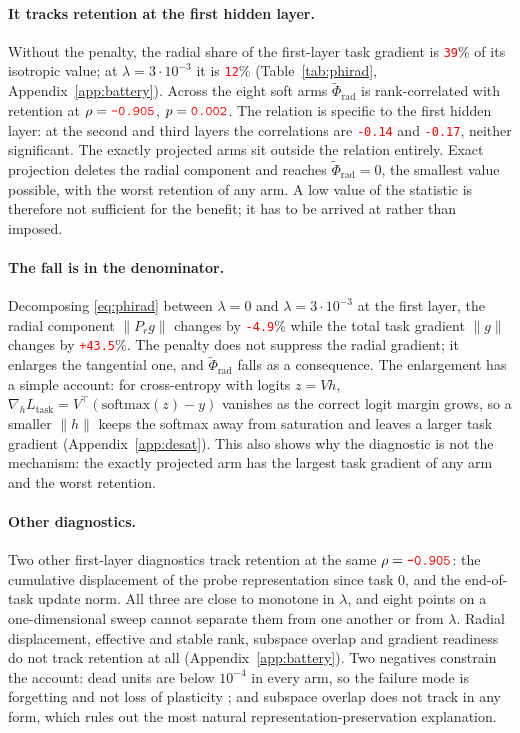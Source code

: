 \documentclass[anon]{opt2026}     %
\newcommand{\PH}[1]{\textcolor{red}{\texttt{#1}}}   %
\newcommand{\phirad}{\tilde{\Phi}_{\mathrm{rad}}}
\begin{document}
\paragraph{It tracks retention at the first hidden layer.} Without the
penalty, the radial share of the first-layer task gradient is \PH{39}\% of its
isotropic value; at $\lambda = 3\cdot10^{-3}$ it is \PH{12}\%
(Table~\ref{tab:phirad}, Appendix~\ref{app:battery}). Across the eight soft
arms $\phirad$ is rank-correlated with retention at $\rho = \PH{-0.905}$,
$p = \PH{0.002}$. The relation is specific to the first hidden layer: at the
second and third layers the correlations are \PH{-0.14} and \PH{-0.17}, neither
significant. The exactly projected arms sit outside the relation entirely. Exact projection deletes the radial component and
reaches $\phirad = 0$, the smallest value possible, with the worst retention of
any arm. A low value of the statistic is therefore not sufficient for the
benefit; it has to be arrived at rather than imposed.

\paragraph{The fall is in the denominator.} Decomposing \eqref{eq:phirad}
between $\lambda = 0$ and $\lambda = 3\cdot10^{-3}$ at the first layer, the
radial component $\|P_r g\|$ changes by \PH{-4.9}\% while the total task
gradient $\|g\|$ changes by \PH{+43.5}\%. The penalty does not suppress the
radial gradient; it enlarges the tangential one, and $\phirad$ falls as a
consequence. The enlargement has a simple account: for cross-entropy with logits
$z = Vh$, $\nabla_h L_{\mathrm{task}} = V^{\top}(\mathrm{softmax}(z) - y)$
vanishes as the correct logit margin grows, so a smaller $\|h\|$ keeps the
softmax away from saturation and leaves a larger task gradient
(Appendix~\ref{app:desat}). This also shows why the diagnostic is not the
mechanism: the exactly projected arm has the largest task gradient of any arm
and the worst retention.

\paragraph{Other diagnostics.} Two other first-layer diagnostics track retention at
the same $\rho = \PH{-0.905}$: the cumulative displacement of the probe
representation since task $0$, and the end-of-task update norm. All three are
close to monotone in $\lambda$, and eight points on a one-dimensional sweep
cannot separate them from one another or from $\lambda$. Radial displacement,
effective and stable rank, subspace overlap and gradient readiness do not track
retention at all (Appendix~\ref{app:battery}). Two negatives constrain the
account: dead units are below $10^{-4}$ in every arm, so the failure mode is
forgetting and not loss of plasticity \citep{dohare2024loss}; and subspace
overlap does not track in any form, which rules out the most natural
representation-preservation explanation.
\end{document}
